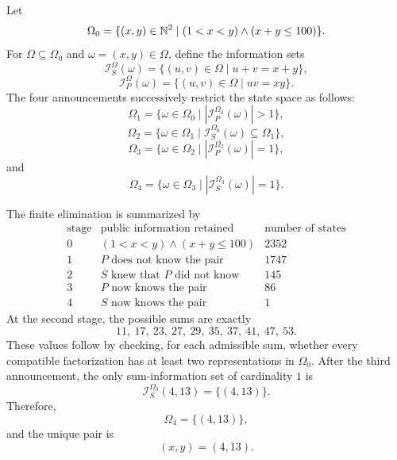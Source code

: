     \begin{solution}
        Let
        \[
            \Omega_0
            =
            \{(x,y)\in\mathbb{N}^2\mid (1<x<y)\land(x+y\leq100)\}.
        \]
        For $\Omega\subseteq\Omega_0$ and $\omega=(x,y)\in\Omega$, define the
        information sets
        \[
            \mathcal{I}_S^\Omega(\omega)
            =
            \{(u,v)\in\Omega\mid u+v=x+y\},
        \]
        \[
            \mathcal{I}_P^\Omega(\omega)
            =
            \{(u,v)\in\Omega\mid uv=xy\}.
        \]
        The four announcements successively restrict the state space as follows:
        \[
            \Omega_1
            =
            \{\omega\in\Omega_0\mid
              |\mathcal{I}_P^{\Omega_0}(\omega)|>1\},
        \]
        \[
            \Omega_2
            =
            \{\omega\in\Omega_1\mid
              \mathcal{I}_S^{\Omega_0}(\omega)\subseteq\Omega_1\},
        \]
        \[
            \Omega_3
            =
            \{\omega\in\Omega_2\mid
              |\mathcal{I}_P^{\Omega_2}(\omega)|=1\},
        \]
        and
        \[
            \Omega_4
            =
            \{\omega\in\Omega_3\mid
              |\mathcal{I}_S^{\Omega_3}(\omega)|=1\}.
        \]

        The finite elimination is summarized by
        \[
            \begin{array}{c|l|c}
                \text{stage} & \text{public information retained} &
                \text{number of states}\\
                \hline
                0 & (1<x<y)\land(x+y\leq100) & 2352\\
                1 & P\text{ does not know the pair} & 1747\\
                2 & S\text{ knew that }P\text{ did not know} & 145\\
                3 & P\text{ now knows the pair} & 86\\
                4 & S\text{ now knows the pair} & 1
            \end{array}
        \]
        At the second stage, the possible sums are exactly
        \[
            11,\ 17,\ 23,\ 27,\ 29,\ 35,\ 37,\ 41,\ 47,\ 53.
        \]
        These values follow by checking, for each admissible sum, whether every
        compatible factorization has at least two representations in
        $\Omega_0$. After the third announcement, the only sum-information set
        of cardinality $1$ is
        \[
            \mathcal{I}_S^{\Omega_3}(4,13)=\{(4,13)\}.
        \]
        Therefore,
        \[
            \Omega_4=\{(4,13)\},
        \]
        and the unique pair is
        \[
            \boxed{(x,y)=(4,13)}.
        \]
    \end{solution}

